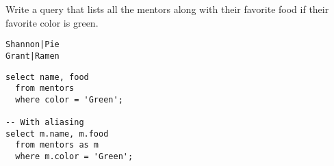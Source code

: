 \begin{blocksection}
\question Write a query that lists all the mentors along with their favorite food if their favorite color is green.

\begin{lstlisting}
Shannon|Pie
Grant|Ramen
\end{lstlisting}

\begin{solution}[1in]
\begin{lstlisting}
select name, food
  from mentors
  where color = 'Green';
  
-- With aliasing
select m.name, m.food
  from mentors as m
  where m.color = 'Green';
\end{lstlisting}
\end{solution}
\end{blocksection}
